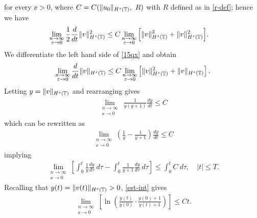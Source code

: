 	for every $\ee > 0$, where $C = C(\|u_0\|_{H^s(\mathbb{T})}, \ R)$ with
	$R$ defined as in \eqref{r-def}; hence we have
\begin{equation}
		\begin{split}
			\lim_{\substack{n \to \infty \\ \varepsilon \to 0} }
			\frac{1}{2}\frac{d}{dt}\|v\|_{H^{s}(\mathbb{T})}^2
			& \le C
			\lim_{\substack{n \to \infty \\ \varepsilon \to 0}}
			\Big [\|v\|_{H^s(\mathbb{T})}^3 + 
			\|v\|_{H^s(\mathbb{T})}^2 \Big ].
			\label{15qx}
		\end{split}
	\end{equation}
	We differentiate the left hand side of \eqref{15qx} and obtain
\begin{equation*}
	\begin{split}
		\lim_{\substack{n \to \infty \\ \varepsilon \to 0}}\frac{d}{dt}
		\|v\|_{H^s(\mathbb{T})} \le C
		\lim_{\substack{n \to \infty \\ \varepsilon \to 0}} \left [\|v\|_{H^s(\mathbb{T})}^2 +
		\|v\|_{H^s(\mathbb{T})} \right ].
	\end{split}
\end{equation*}
Letting $y = \|v\|_{H^s(\mathbb{T})}$ and rearranging gives
\begin{equation*}
	\begin{split}
		\lim_{\substack{n \to \infty \\ \ee \to 0} } \ \frac{1}{y(y+1)} \frac{dy}{dt}
		\le	C
	\end{split}
\end{equation*}
which can be rewritten as
\begin{equation*}
	\begin{split}
		\lim_{\substack{n \to \infty \\ \ee \to 0} }
		\left( \frac{1}{y} - \frac{1}{y+1} \right)\frac{dy}{dt} \le C 
	\end{split}
\end{equation*}
implying
\begin{equation}
	\label{est-int}
	\begin{split}
		\lim_{\substack{n \to \infty \\ \ee \to 0} } \left [
\int_0^t \frac{1}{y} \frac{dy}{d \tau} \ d \tau
		- \int_0^t \frac{1}{y+1} \frac{dy}{d \tau} \ d \tau \right ]
		\le \int_0^t C \ d \tau, \quad |t| \le T.
	\end{split}
\end{equation}
Recalling that $y(t) = \|v(t)\|_{H^s(\mathbb{T})} > 0$, \eqref{est-int} gives 
\begin{equation}
	\begin{split}
	\lim_{\substack{n \to \infty \\ \ee \to 0} }
	\left [ \ln \left ( \frac{y(t)}{y(0)}
	\cdot \frac{y(0) + 1}{y(t) + 1} \right ) \right ] \le C t.
		\label{301'qx}
	\end{split}
\end{equation}
